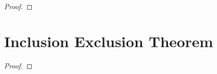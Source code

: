         \begin{corollary}
        \end{corollary}
        \begin{proof}
        \end{proof}
    \section{Inclusion Exclusion Theorem}
        \begin{theorem}
        \end{theorem}
        \begin{proof}
        \end{proof}
